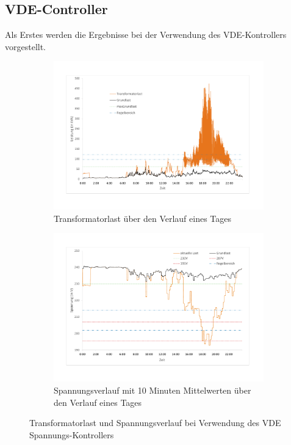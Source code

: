 \subsection{VDE-Controller}
\label{chap_VDE}
Als Erstes werden die Ergebnisse bei der Verwendung des VDE-Kontrollers vorgestellt.
\begin{figure}
\begin{subfigure}{\linewidth}
	\includegraphics[scale=0.45]{img/VDE_tau/TrafoLast9.pdf}
	\caption{Transformatorlast über den Verlauf eines Tages}
	\label{Abb_VDEtauTrafoLast}
\end{subfigure}
\begin{subfigure}{\linewidth}
	\includegraphics[scale=0.45]{img/VDE_tau/Voltage3.pdf}
	\caption{Spannungsverlauf mit 10 Minuten Mittelwerten über den Verlauf eines Tages}
	\label{Abb_VDEtauSpannung10m}
\end{subfigure}
\caption{Transformatorlast und Spannungsverlauf bei Verwendung des VDE Spannungs-Kontrollers}
\end{figure}

